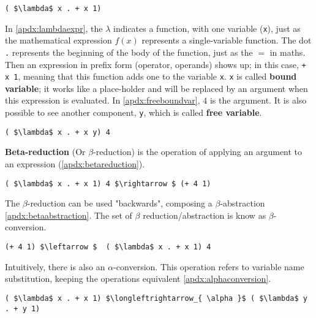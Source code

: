 \begin{lstlisting}[caption={Lambda abstraction}, captionpos=b, mathescape=true, label={apdx:lambdaexpr}]
  ( $\lambda$ x . + x 1)
\end{lstlisting}

In \ref{apdx:lambdaexpr}, the $\lambda$ indicates a function, with one variable (\lstinline!x!), just as the mathematical expression $f(x)$ represents a single-variable function. The dot \lstinline!.! represents the beginning of the body of the function, just as the $=$ in maths. Then an expression in prefix form (operator, operands) shows up; in this case, \lstinline!+ x 1!, meaning that this function adds one to the variable \lstinline!x!. \lstinline!x! is called \textbf{bound variable}; it works like a place-holder and will be replaced by an argument when this expression is evaluated. In \cref{apdx:freeboundvar}, $4$ is the argument. It is also possible to see another component, \lstinline!y!, which is called \textbf{free variable}.

\begin{lstlisting}[caption={Free variable: y; Bound Variable: x}, captionpos=b, mathescape=true, label={apdx:freeboundvar}]
  ( $\lambda$ x . + x y) 4
\end{lstlisting}

\textbf{Beta-reduction} (Or $\beta$-reduction) is the operation of applying an argument to an expression (\ref{apdx:betareduction}).

\begin{lstlisting}[caption={Beta reduction}, captionpos=b, mathescape=true, label={apdx:betareduction}]
  ( $\lambda$ x . + x 1) 4 $\rightarrow $ (+ 4 1)
\end{lstlisting}

The $\beta$-reduction can be used "backwards", composing a $\beta$-abstraction \ref{apdx:betaabstraction}. The set of $\beta$ reduction/abstraction is know as $\beta$-conversion.

\begin{lstlisting}[caption={Beta abstraction}, captionpos=b, mathescape=true, label={apdx:betaabstraction}]
  (+ 4 1) $\leftarrow $  ( $\lambda$ x . + x 1) 4 
\end{lstlisting}

Intuitively, there is also an $\alpha$-conversion. This operation refers to variable name substitution, keeping the operations equivalent \ref{apdx:alphaconversion}.

\begin{lstlisting}[caption={Alpha conversion}, captionpos=b, mathescape=true, label={apdx:alphaconversion}]
  ( $\lambda$ x . + x 1) $\longleftrightarrow_{ \alpha }$ ( $\lambda$ y . + y 1) 
\end{lstlisting}

